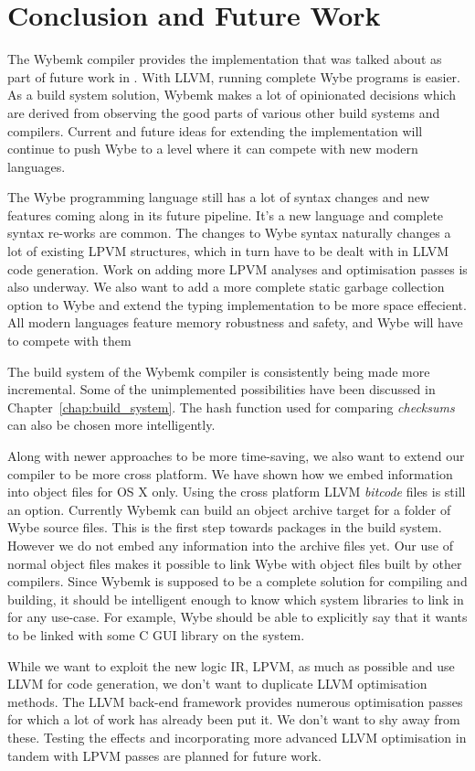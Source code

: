 \chapter{Conclusion and Future Work}
\label{chap:future_work}

The Wybemk compiler provides the implementation that was talked about as part
of future work in \cite{lpvm2015}. With LLVM, running complete Wybe programs is
easier. As a build system solution, Wybemk makes a lot of opinionated decisions
which are derived from observing the good parts of various other build systems
and compilers. Current and future ideas for extending the implementation will
continue to push Wybe to a level where it can compete with new modern
languages.

The Wybe programming language still has a lot of syntax changes and new
features coming along in its future pipeline. It's a new language and complete
syntax re-works are common. The changes to Wybe syntax naturally changes a lot
of existing LPVM structures, which in turn have to be dealt with in LLVM code
generation. Work on adding more LPVM analyses and optimisation passes is also
underway. We also want to add a more complete static garbage collection option
to Wybe and extend the typing implementation to be more space effecient. All
modern languages feature memory robustness and safety, and Wybe will have to
compete with them

The build system of the Wybemk compiler is consistently being made more
incremental. Some of the unimplemented possibilities have been discussed in
Chapter~\ref{chap:build_system}. The hash function used for comparing
\textit{checksums} can also be chosen more intelligently.

Along with newer approaches to be more time-saving, we also want to extend our
compiler to be more cross platform. We have shown how we embed information into
\macho object files for OS X only. Using the cross platform LLVM
\textit{bitcode} files is still an option. Currently Wybemk can build an object
archive target for a folder of Wybe source files. This is the first step
towards packages in the build system. However we do not embed any information
into the archive files yet. Our use of normal object files makes it possible to
link Wybe with object files built by other compilers. Since Wybemk is supposed
to be a complete solution for compiling and building, it should be intelligent
enough to know which system libraries to link in for any use-case. For example,
Wybe should be able to explicitly say that it wants to be linked with some C
GUI library on the system.

While we want to exploit the new logic IR, LPVM, as much as possible and use
LLVM for code generation, we don't want to duplicate LLVM optimisation
methods. The LLVM back-end framework provides numerous optimisation passes for
which a lot of work has already been put it.  We don't want to shy away from
these. Testing the effects and incorporating more advanced LLVM optimisation in
tandem with LPVM passes are planned for future work.



